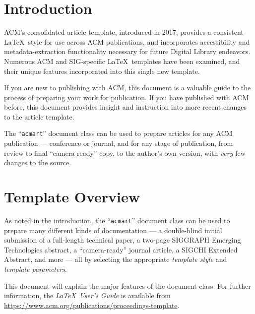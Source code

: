 \documentclass[sigconf, authordraft]{acmart}
\begin{document}
	  

	\maketitle


	\section{Introduction}
	ACM's consolidated article template, introduced in 2017, provides a consistent
	\LaTeX\ style for use across ACM publications, and incorporates accessibility and
	metadata-extraction functionality necessary for future Digital Library endeavors.
	Numerous ACM and SIG-specific \LaTeX\ templates have been examined, and their unique
	features incorporated into this single new template.

	If you are new to publishing with ACM, this document is a valuable guide to
	the process of preparing your work for publication. If you have published with
	ACM before, this document provides insight and instruction into more recent
	changes to the article template.

	The ``\verb|acmart|'' document class can be used to prepare articles for any
	ACM publication --- conference or journal, and for any stage of publication,
	from review to final ``camera-ready'' copy, to the author's own version, with
	{\itshape very} few changes to the source.

	\section{Template Overview}
	As noted in the introduction, the ``\verb|acmart|'' document class can be used
	to prepare many different kinds of documentation --- a double-blind initial submission
	of a full-length technical paper, a two-page SIGGRAPH Emerging Technologies
	abstract, a ``camera-ready'' journal article, a SIGCHI Extended Abstract, and more
	--- all by selecting the appropriate {\itshape template style} and {\itshape template parameters}.

	This document will explain the major features of the document class. For
	further information, the {\itshape \LaTeX\ User's Guide} is available from \url{https://www.acm.org/publications/proceedings-template}.
\end{document}
